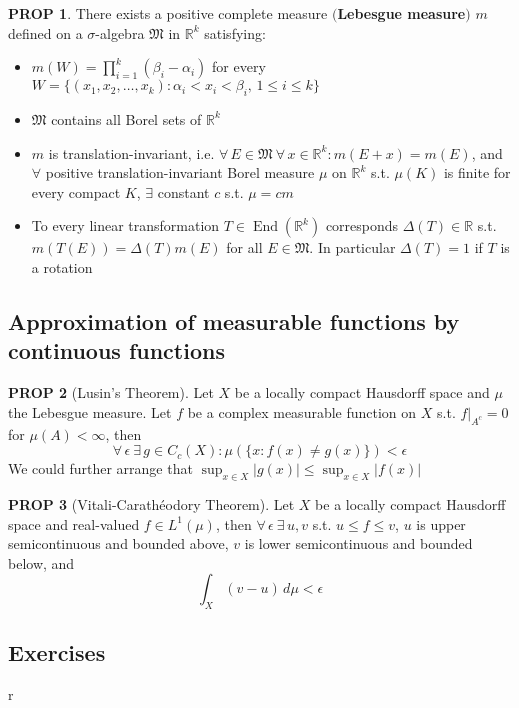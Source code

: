\documentclass[hidelinks,10pt]{article}
\theoremstyle{definition}
\theoremstyle{dotles}
\newenvironment{exercise}[1]
  {\renewcommand\theinnercustomex{#1}\innercustomex}
  {\endinnercustomex}
\theoremstyle{dotless}
\newtheorem{proposition}{PROP}[section]
\theoremstyle{remark}
\DeclareMathOperator{\End}{End}
\begin{document}
\begin{proposition}There exists a positive complete measure $($\textbf{Lebesgue measure}$)$ $m$ defined on a $\sigma$-algebra $\mathfrak{M}$ in $\mathbb{R}^k$ satisfying:\begin{itemize}
    \item $m(W)=\prod_{i=1}^k(\beta_i-\alpha_i)$ for every $W=\{(x_1,x_2,\dots,x_k):\alpha_i<x_i<\beta_i,\,1\leq i\leq k\}$
    \item $\mathfrak{M}$ contains all Borel sets of $\mathbb{R}^k$
    \item $m$ is translation-invariant, i.e. $\forall\,E\in\mathfrak{M}\ \forall\, x\in\mathbb{R}^k:m(E+x)=m(E)$, and $\forall$ positive translation-invariant Borel measure $\mu$ on $\mathbb{R}^k$ s.t. $\mu(K)$ is finite for every compact $K$, $\exists$ constant $c$ s.t. $\mu=cm$
    \item To every linear transformation $T\in\End(\mathbb{R}^k)$ corresponds $\Delta(T)\in\mathbb{R}$ s.t. $m(T(E))=\Delta(T)m(E)$ for all $E\in\mathfrak{M}$. In particular $\Delta(T)=1$ if $T$ is a rotation
\end{itemize}
\end{proposition}

\subsection{Approximation of measurable functions by continuous functions}

\begin{proposition}[Lusin's Theorem]Let $X$ be a locally compact Hausdorff space and $\mu$ the Lebesgue measure. Let $f$ be a complex measurable function on $X$ s.t. $f|_{A^c}=0$ for $\mu(A)<\infty$, then
\[\forall\,\epsilon\ \exists\,g\in C_c(X):\mu(\{x:f(x)\neq g(x)\})<\epsilon\]
We could further arrange that $\sup_{x\in X}|g(x)|\leq\sup_{x\in X}|f(x)|$
\end{proposition}

\begin{proposition}[Vitali-Carathéodory Theorem]Let $X$ be a locally compact Hausdorff space and real-valued $f\in L^1(\mu)$, then $\forall\,\epsilon\ \exists\,u,v$ s.t. $u\leq f\leq v$, $u$ is upper semicontinuous and bounded above, $v$ is lower semicontinuous and bounded below, and
\[\int_X(v-u)\,d\mu<\epsilon\]
\end{proposition}

\subsection*{Exercises}

\begin{exercise}{2.1}
r
\end{exercise}
\end{document}
